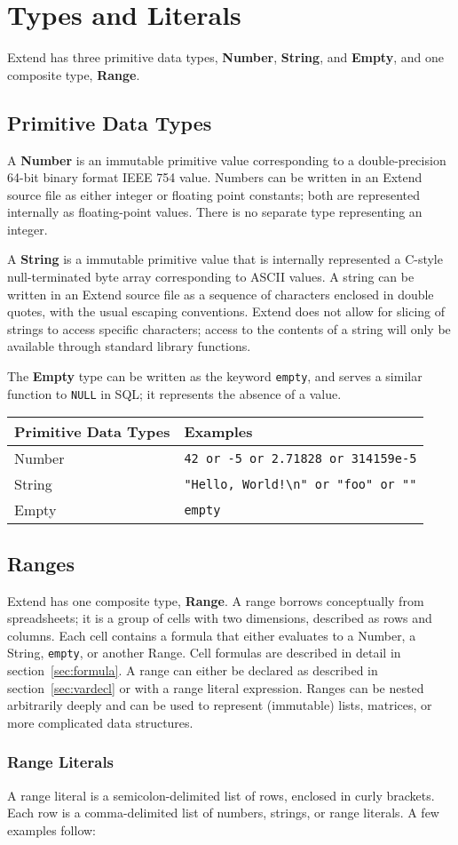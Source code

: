 \section{Types and Literals}
		Extend has three primitive data types, \textbf{Number}, \textbf{String}, and \textbf{Empty}, and one composite type, \textbf{Range}.
	\subsection{Primitive Data Types}
		A \textbf{Number} is an immutable primitive value corresponding to a double-precision 64-bit binary format IEEE 754 value. Numbers can be written in an Extend source file as either integer or floating point constants; both are represented internally as floating-point values. There is no separate type representing an integer.

		A \textbf{String} is a immutable primitive value that is internally represented a C-style null-terminated byte array corresponding to ASCII values. A string can be written in an Extend source file as a sequence of characters enclosed in double quotes, with the usual escaping conventions. Extend does not allow for slicing of strings to access specific characters; access to the contents of a string will only be available through standard library functions.

		The \textbf{Empty} type can be written as the keyword \texttt{empty}, and serves a similar function to \texttt{NULL} in SQL; it represents the absence of a value.
		\newline
		\begin{table}[H]
		\centering
		\begin{tabular} {| l | l |}
			\hline
			\textbf{Primitive Data Types} & \textbf{Examples} \\ \hline
			Number & \texttt{42 or -5 or 2.71828 or 314159e-5} \\ \hline
			String & \texttt{"Hello, World!\textbackslash n" or "foo" or ""} \\ \hline
			Empty & \texttt{empty} \\ \hline
		\end{tabular}
		\end{table}
	\subsection{Ranges}
		Extend has one composite type, \textbf{Range}. A range borrows conceptually from spreadsheets; it is a group of cells with two dimensions, described as rows and columns. Each cell contains a formula that either evaluates to a Number, a String, \texttt{empty}, or another Range. Cell formulas are described in detail in section~\ref{sec:formula}. A range can either be declared as described in section~\ref{sec:vardecl} or with a range literal expression. Ranges can be nested arbitrarily deeply and can be used to represent (immutable) lists, matrices, or more complicated data structures.
\subsubsection{Range Literals}
		A range literal is a semicolon-delimited list of rows, enclosed in curly brackets. Each row is a comma-delimited list of numbers, strings, or range literals. A few examples follow:
		
